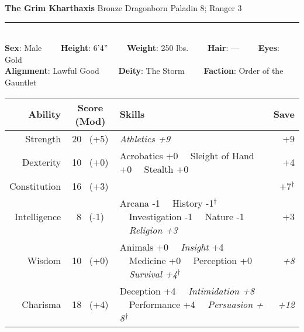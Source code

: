 \documentclass[11pt]{article}
\newcommand{\proficient}[1]{{\slshape #1}}
\newcommand{\heading}[1]{{\sc\bfseries #1}}
\begin{document}
\pagestyle{empty}
\noindent
{\huge\bfseries The Grim Kharthaxis}
\hfill
{\Large Bronze Dragonborn}
\hfill
{\Large Paladin 8;  Ranger 3}

\hrule

\mbox{ }
\\[6pt]
\heading{Sex}: Male
\ \ \ \
\heading{Height}: 6'4''
\ \ \ \
\heading{Weight}: 250 lbs.
\ \ \ \
\heading{Hair}: ---
\ \ \ \
\heading{Eyes}: Gold
\\[4pt]
\heading{Alignment}: Lawful Good
\ \ \ \
\heading{Deity}: The Storm
\ \ \ \
\heading{Faction}: Order of the Gauntlet
\\[12pt]
%
\begin{tabular}{|r|c|l|r|}
\hline
\heading{Ability}
& \heading{Score (Mod)}
& \heading{Skills}
& \heading{Save}
\\ \hline \hline
\sc Strength & 20 \ (+5)
& \proficient{Athletics +9}
& +9
\\
\sc Dexterity & 10 \ (+0)
& Acrobatics +0 \ \ Sleight of Hand +0 \ \ Stealth +0
& +4
\\
\sc Constitution & 16 \ (+3)
&
& +7$^\dagger$
\\ \hline
\sc Intelligence & \hspace*{0.2em} 8 \ (\hspace*{0.25em}-1)
& Arcana -1 \ \ History -1$^\dagger$ \ \ Investigation -1 \ \ Nature -1 \ \ \proficient{Religion +3}
& +3
\\
\sc Wisdom & 10 \ (+0)
& Animals +0 \ \ \proficient{Insight} +4 \ \ Medicine +0 \ \ Perception +0 \ \ \proficient{Survival +4}\hspace{0.75pt}$^\dagger$
& \proficient{+8}
\\
\sc Charisma & 18 \ (+4)
& Deception +4 \ \ \proficient{Intimidation +8} \ \ Performance +4 \ \ \proficient{Persuasion + 8}$\hspace{1pt}^\dagger$
& \proficient{+12}
\\ \hline
\end{tabular}
\\[2pt]
\end{document}
